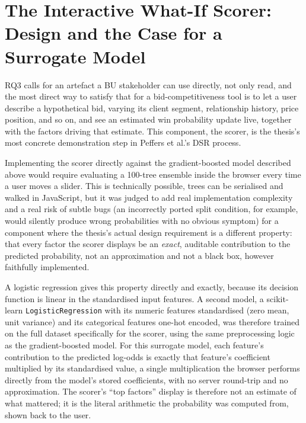 \hypertarget{the-interactive-what-if-scorer-design-and-the-case-for-a-surrogate-model}{%
\section{The Interactive What-If Scorer: Design and the Case for a
Surrogate
Model}\label{the-interactive-what-if-scorer-design-and-the-case-for-a-surrogate-model}}

RQ3 calls for an artefact a BU stakeholder can use directly, not only
read, and the most direct way to satisfy that for a bid-competitiveness
tool is to let a user describe a hypothetical bid, varying its client
segment, relationship history, price position, and so on, and see an
estimated win probability update live, together with the factors driving
that estimate. This component, the scorer, is the thesis's most concrete
demonstration step in Peffers et al.'s \citeyearpar{peffers2007design}
DSR process.

Implementing the scorer directly against the gradient-boosted model
described above would require evaluating a 100-tree ensemble inside the
browser every time a user moves a slider. This is technically possible,
trees can be serialised and walked in JavaScript, but it was judged to
add real implementation complexity and a real risk of subtle bugs (an
incorrectly ported split condition, for example, would silently produce
wrong probabilities with no obvious symptom) for a component where the
thesis's actual design requirement is a different property: that every
factor the scorer displays be an \emph{exact}, auditable contribution to
the predicted probability, not an approximation and not a black box,
however faithfully implemented.

A logistic regression gives this property directly and exactly, because
its decision function is linear in the standardised input features. A
second model, a scikit-learn \texttt{LogisticRegression} with its
numeric features standardised (zero mean, unit variance) and its
categorical features one-hot encoded, was therefore trained on the full
dataset specifically for the scorer, using the same preprocessing logic
as the gradient-boosted model. For this surrogate model, each feature's
contribution to the predicted log-odds is exactly that feature's
coefficient multiplied by its standardised value, a single
multiplication the browser performs directly from the model's stored
coefficients, with no server round-trip and no approximation. The
scorer's ``top factors'' display is therefore not an estimate of what
mattered; it is the literal arithmetic the probability was computed
from, shown back to the user.

